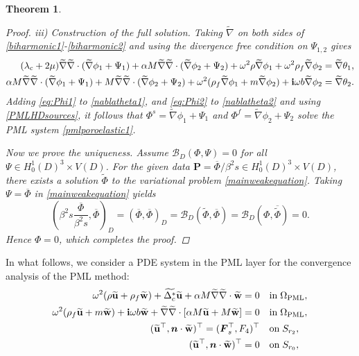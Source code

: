 \documentclass[11pt]{article}
\newcommand{\ov}{\overline}
\newcommand{\Om}{\Omega}
\newcommand{\la}{\lambda}
\newcommand{\De}{\Delta}
\newcommand{\wid}{\widetilde}
\newcommand{\bs}{\boldsymbol}
\newcommand{\PML}{{\rm PML}}
\newtheorem{theorem}{Theorem}[section]
\begin{document}
\begin{theorem}
\begin{proof}
iii) \textit{Construction of the full solution.} 
Taking $\wid{\nabla}$ on both sides of \eqref{biharmonic1}-\eqref{biharmonic2} and using the divergence
free condition on $\Psi_{1,2}$ gives
\begin{align}\label{nablatheta1}
(\la_c+2\mu) \wid{\nabla}\wid{\nabla}\cdot(\wid{\nabla} \phi_1+\Psi_1)+\alpha M \wid{\nabla}
\wid{\nabla}\cdot(\wid{\nabla} \phi_2+\Psi_2)+\omega^2\rho \wid{\nabla}\phi_1 +\omega^2\rho_f 
\wid{\nabla}\phi_2&= \wid{\nabla}\theta_1,\\ \label{nablatheta2}
\alpha M \wid{\nabla}\wid{\nabla}\cdot(\wid{\nabla} \phi_1+\Psi_1)+ M \wid{\nabla}\wid{\nabla}
\cdot(\wid{\nabla} \phi_2+\Psi_2)+ \omega^2(\rho_f \wid{\nabla}\phi_1+m \wid{\nabla}\phi_2)
+{\bf i}\omega b \wid{\nabla}\phi_2&= \wid{\nabla}\theta_2.
\end{align}
Adding \eqref{eq:Phi1} to \eqref{nablatheta1}, and \eqref{eq:Phi2} to \eqref{nablatheta2} and 
using \eqref{PMLHDsources}, it follows that 
$\Phi^s = \wid{\nabla}\phi_1 + \Psi_1$ and $\Phi^f = \wid{\nabla}\phi_2 + \Psi_2$ solve the 
PML system \eqref{pmlporoelastic1}.

Now we prove the uniqueness. Assume $\mathcal{B}_{D}(\Phi,\Psi)=0$ for all $\Psi\in H_0^1(D)^3\times V(D)$.
For the given data $\bs{P}=\ov{\Phi}/\beta^{2}s \in H_0^1(D)^3\times V(D)$, there exists a solution
$\wid{\Phi}$ to the variational problem \eqref{mainweakequation}.
Taking $\Psi=\ov{\Phi}$ in \eqref{mainweakequation} yields
\begin{equation*}
\left(\beta^2s\frac{\ov{\Phi}}{\beta^2s},\ov{\Phi} \right)_D= (\overline{\Phi},\overline{\Phi} )_D
= \mathcal{B}_{D}(\wid{\Phi},\overline{\Phi}) = \mathcal{B}_{D}(\Phi,\overline{\wid{\Phi}})=0.
\end{equation*}	
Hence $\Phi = 0$, which completes the proof.
\end{proof}

\end{theorem}
In what follows, we consider a PDE system in the PML layer for the convergence analysis of the PML method:
\begin{subequations}
\begin{align}\label{PMLlayerstabilityequa1}
\omega^2(\rho\wid{\mathbf{u}} +\rho_f \wid{\mathbf{w}})+\wid{\De_c^*}\wid{\mathbf{u}} +\alpha M\wid{\nabla} 
\wid{\nabla}\cdot  \wid{\mathbf{w}}=0
\quad &{\rm in} \;\Om_{\PML} , \\ \label{PMLlayerstabilityequa22}
\omega^2(\rho_f \wid{\mathbf{u}}+m \wid{\mathbf{w}})+{\bf{i}}\omega b \wid{\mathbf{w}}+\wid{\nabla} \wid{\nabla} 
\cdot [\alpha M \wid{\mathbf{u}}+ M \wid{\mathbf{w}}]=0 
\quad &{\rm in} \;\Om_{\PML},\\\label{PMLlayerconditionouter}
(\wid{\mathbf{u}}^{\top},	\bs{n}\cdot\wid{\mathbf{w}})^{\top} =(\bs{F}_s^{\top},F_4)^{\top} \quad &{\rm on} 
\; S_{r_2},\\ \label{PMLlayerconditioninner}
(\wid{\mathbf{u}}^{\top},	\bs{n}\cdot\wid{\mathbf{w}})^{\top}=0 \quad &{\rm on} \; S_{r_0},
\end{align}
\end{subequations}
\end{document}
